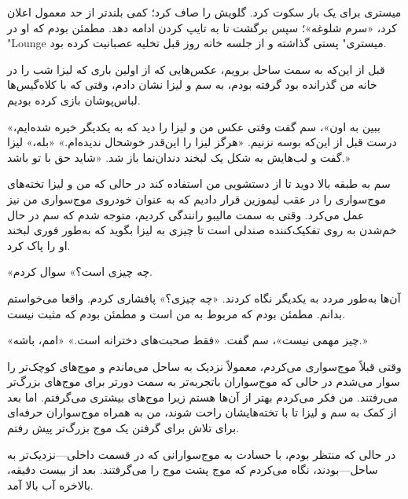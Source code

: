 میستری برای یک بار سکوت کرد. گلویش را صاف کرد؛ کمی بلندتر از حد معمول اعلان کرد، «سرم شلوغه»؛ سپس برگشت تا به تایپ کردن ادامه دهد. مطمئن بودم که او در "Lounge میستری" پستی گذاشته و از جلسه خانه روز قبل تخلیه عصبانیت کرده بود.  

قبل از این‌که به سمت ساحل برویم، عکس‌هایی که از اولین باری که لیزا شب را در خانه من گذرانده بود گرفته بودم، به سم و لیزا نشان دادم، وقتی که با کلاه‌گیس‌ها لباس‌پوشان بازی کرده بودیم.  

«ببین به اون»، سم گفت وقتی عکس من و لیزا را دید که به یکدیگر خیره شده‌ایم، درست قبل از این‌که بوسه نزنیم. «هرگز لیزا را این‌قدر خوشحال ندیده‌ام.»  
«بله،» لیزا گفت و لب‌هایش به شکل یک لبخند دندان‌نما باز شد. «شاید حق با تو باشد.»  

سم به طبقه بالا دوید تا از دستشویی من استفاده کند در حالی که من و لیزا تخته‌های موج‌سواری را در عقب لیموزین قرار دادیم که به عنوان خودروی موج‌سواری من نیز عمل می‌کرد. وقتی به سمت مالیبو رانندگی کردیم، متوجه شدم که سم در حال خم‌شدن به روی تفکیک‌کننده صندلی است تا چیزی به لیزا بگوید که به‌طور فوری لبخند او را پاک کرد.  

«چه چیزی است؟» سوال کردم.  

آن‌ها به‌طور مردد به یکدیگر نگاه کردند. «چه چیزی؟» پافشاری کردم. واقعا می‌خواستم بدانم. مطمئن بودم که مربوط به من است و مطمئن بودم که مثبت نیست.  

«چیز مهمی نیست»، سم گفت. «فقط صحبت‌های دخترانه است.»  
«امم، باشه.»  

وقتی قبلاً موج‌سواری می‌کردم، معمولاً نزدیک به ساحل می‌ماندم و موج‌های کوچک‌تر را سوار می‌شدم در حالی که موج‌سواران باتجربه‌تر به سمت دورتر برای موج‌های بزرگ‌تر می‌رفتند. من فکر می‌کردم بهتر از آن‌ها هستم زیرا موج‌های بیشتری می‌گرفتم. اما بعد از کمک به سم و لیزا تا با تخته‌هایشان راحت شوند، من به همراه موج‌سواران حرفه‌ای برای تلاش برای گرفتن یک موج بزرگ‌تر پیش رفتم.  

در حالی که منتظر بودم، با حسادت به موج‌سوارانی که در قسمت داخلی—نزدیک‌تر به ساحل—بودند، نگاه می‌کردم که موج پشت موج را می‌گرفتند. بعد از بیست دقیقه، بالاخره آب بالا آمد.